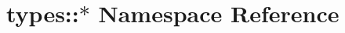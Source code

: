 \hypertarget{namespacetypes_1_1_5}{
\section{types::$\ast$ Namespace Reference}
\label{namespacetypes_1_1_5}
}


